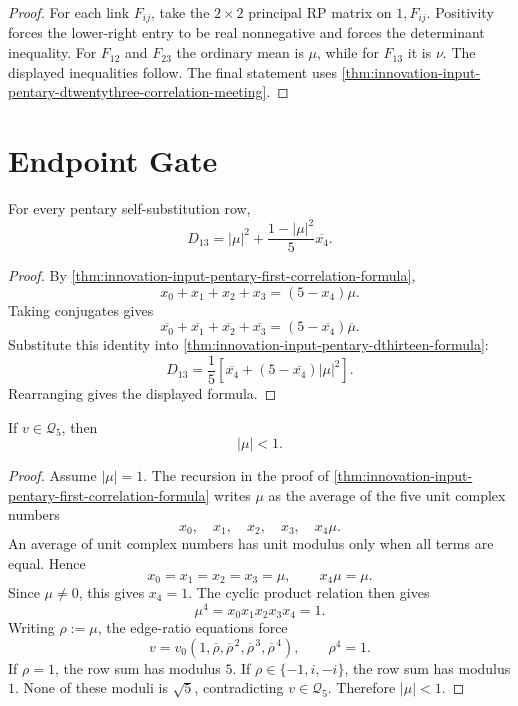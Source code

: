 \begin{proof}
For each link $F_{ij}$, take the $2\times2$ principal RP matrix on
$1,F_{ij}$. Positivity forces the lower-right entry to be real
nonnegative and forces the determinant inequality. For $F_{12}$ and
$F_{23}$ the ordinary mean is $\mu$, while for $F_{13}$ it is $\nu$.
The displayed inequalities follow. The final statement uses
\autoref{thm:innovation-input-pentary-dtwentythree-correlation-meeting}.
\end{proof}

\section{Endpoint Gate}
\label{sec:innovation-input-pentary-endpoint-gate}

\begin{theorem}
\label{thm:innovation-input-pentary-dthirteen-endpoint-form}
For every pentary self-substitution row,
$$
D_{13}
=
|\mu|^2+\frac{1-|\mu|^2}{5}\overline{x_4}.
$$
\end{theorem}

\begin{proof}
By
\autoref{thm:innovation-input-pentary-first-correlation-formula},
$$
x_0+x_1+x_2+x_3=(5-x_4)\mu.
$$
Taking conjugates gives
$$
\overline{x_0}+\overline{x_1}+\overline{x_2}+\overline{x_3}
=
(5-\overline{x_4})\overline\mu.
$$
Substitute this identity into
\autoref{thm:innovation-input-pentary-dthirteen-formula}:
$$
D_{13}
=
\frac15
\left[
\overline{x_4}
+
(5-\overline{x_4})|\mu|^2
\right].
$$
Rearranging gives the displayed formula.
\end{proof}

\begin{lemma}
\label{lem:innovation-input-pentary-qthree-excludes-unit-first-correlation}
If $v\in\mathcal Q_5$, then
$$
|\mu|<1.
$$
\end{lemma}

\begin{proof}
Assume $|\mu|=1$. The recursion in the proof of
\autoref{thm:innovation-input-pentary-first-correlation-formula} writes
$\mu$ as the average of the five unit complex numbers
$$
x_0,\quad x_1,\quad x_2,\quad x_3,\quad x_4\mu.
$$
An average of unit complex numbers has unit modulus only when all terms
are equal. Hence
$$
x_0=x_1=x_2=x_3=\mu,
\qquad
x_4\mu=\mu.
$$
Since $\mu\ne0$, this gives $x_4=1$. The cyclic product relation then
gives
$$
\mu^4=x_0x_1x_2x_3x_4=1.
$$
Writing $\rho:=\mu$, the edge-ratio equations force
$$
v
=
v_0(1,\overline\rho,\overline\rho^{\,2},
\overline\rho^{\,3},\overline\rho^{\,4}),
\qquad
\rho^4=1.
$$
If $\rho=1$, the row sum has modulus $5$. If
$\rho\in\{-1,i,-i\}$, the row sum has modulus $1$. None of these moduli
is $\sqrt5$, contradicting $v\in\mathcal Q_5$. Therefore $|\mu|<1$.
\end{proof}

